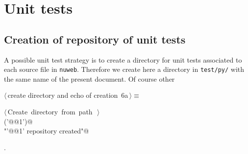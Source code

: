 \documentclass[11pt,oneside]{article}	%
\begin{document}
\section{Unit tests}

\subsection{Creation of repository of unit tests}

A possible unit test strategy is to create a directory for unit tests associated to each source file in \texttt{nuweb}. Therefore we create here a directory in \texttt{test/py/} with the same name of the present document. Of course other 

\begin{flushleft} \small
\begin{minipage}{\linewidth} \label{scrap17}
\protect{}$\langle\,$create directory and echo of creation\nobreak\ {\footnotesize 6a}$\,\rangle\equiv$
\vspace{-1ex}
\begin{list}{}{} \item
\mbox{}\verb@@\hbox{$\langle\,$Create directory from path\nobreak\ {\footnotesize {}}$\,\rangle$}\verb@@\\
\mbox{}\verb@createDir('@@1\verb@')@\\
\mbox{}\verb@print "'@@1\verb@' repository created"@\\
\mbox{}\verb@@{\NWsep}
\end{list}
\vspace{-1ex}
\footnotesize\addtolength{\baselineskip}{-1ex}
\begin{list}{}{\setlength{\itemsep}{-\parsep}\setlength{\itemindent}{-\leftmargin}}
\item {\NWtxtMacroNoRef}.
\end{list}
\end{minipage}\\[4ex]
\end{flushleft}
\end{document}
